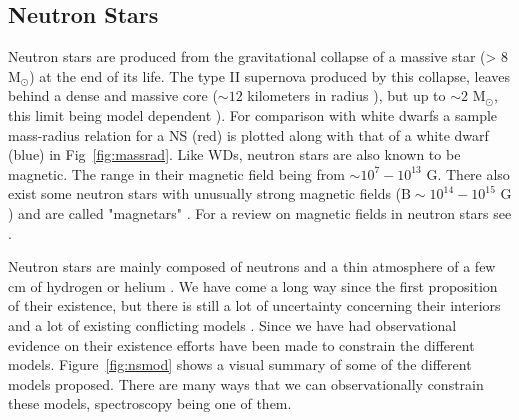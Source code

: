 \subsection{Neutron Stars}\label{sec:ns}

Neutron stars are produced from the gravitational collapse of a massive star (> 8 M$_\odot$)\citep{de2008stars} at the end of its life. The type II supernova produced by this collapse, leaves behind a dense and massive core ($\sim 12$ kilometers in radius \citep{de2008stars}), but up to $\sim 2$ M$_\odot$, this limit being model dependent \cite[see][]{lattimer_neutron_2007}). For comparison with white dwarfs a sample mass-radius relation for a NS (red) is plotted along with that of a white dwarf (blue) in Fig~\ref{fig:massrad}. Like WDs, neutron stars are also known to be magnetic. The range in their magnetic field being from $\sim 10^7 - 10^{13}$ G. There also exist some neutron stars with unusually strong magnetic fields ($\text{B}\sim 10^{14} - 10^{15}\text{ G}$) and are called "magnetars" \citep{duncan_formation_1992}. For a review on magnetic fields in neutron stars see \cite{reisenegger_magnetic_2005}. 


Neutron stars are mainly composed of neutrons and a thin atmosphere of a few cm of hydrogen or helium \citep{zavlin_ns_1996}. We have come a long way since the first proposition of their existence, but there is still a lot of  uncertainty concerning their interiors and a lot of existing conflicting models \citep{lattimer_neutron_2007}. Since we have had observational evidence on their existence \citep{hewish_pulsar_1968} efforts have been made to constrain the different models. Figure~\ref{fig:nsmod} shows a visual summary of some of the different models proposed. There are many ways that we can observationally constrain these models, spectroscopy being one of them.

